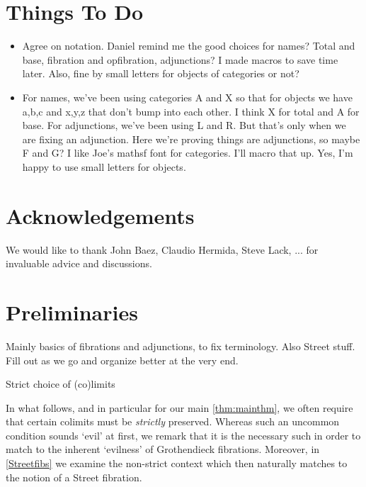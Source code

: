 \documentclass{amsart}
\begin{document}
\section*{Things To Do}
\begin{itemize}
 \item Agree on notation. {\chris Daniel remind me
     the good choices for names? Total and base,
     fibration and opfibration, adjunctions? I
     made macros to save time later. Also, fine by
     small letters for objects of categories or
     not?}
 \item {\daniel For names, we've been using
     categories A and X so that for objects we
     have a,b,c and x,y,z that don't bump into
     each other. I think X for total and A for
     base.  For adjunctions, we've been using L
     and R. But that's only when we are fixing an
     adjunction.  Here we're proving things are
     adjunctions, so maybe F and G?  I like Joe's
     mathsf font for categories.  I'll macro that
     up. Yes, I'm happy to use small letters for objects.}
   
\end{itemize}

\section*{Acknowledgements} We would like to thank John Baez, Claudio Hermida, Steve Lack, ... for invaluable advice and discussions.

\section{Preliminaries}\label{sec:preliminaries}

{\chris Mainly basics of fibrations and adjunctions, to fix terminology. Also Street stuff. Fill out as we go and organize better at the very end.
}

{\chris Strict choice of (co)limits}

In what follows, and in particular for our main \cref{thm:mainthm}, we often require that certain colimits must be \emph{strictly} preserved. Whereas such an uncommon condition sounds `evil' at first, we remark that it is the necessary such in order to match to the inherent `evilness' of Grothendieck fibrations. Moreover, in \cref{Streetfibs} we examine the non-strict context which then naturally matches to the notion of a Street fibration.
\end{document}
